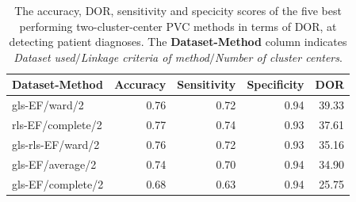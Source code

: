 \begin{table}
    \centering
    \begin{tabular}{lrrrr}
        \toprule
        Dataset-Method    &  Accuracy &  Sensitivity &  Specificity &   DOR \\
        \midrule
        gls-EF/ward/2     &      0.76 &         0.72 &         0.94 & 39.33 \\
        rls-EF/complete/2 &      0.77 &         0.74 &         0.93 & 37.61 \\
        gls-rls-EF/ward/2 &      0.76 &         0.72 &         0.93 & 35.16 \\
        gls-EF/average/2  &      0.74 &         0.70 &         0.94 & 34.90 \\
        gls-EF/complete/2 &      0.68 &         0.63 &         0.94 & 25.75 \\
        \bottomrule
    \end{tabular}
    \caption{The accuracy, DOR, sensitivity and specicity scores of the five best performing two-cluster-center PVC methods in terms of DOR, at detecting patient diagnoses.
             The \textbf{Dataset-Method} column indicates \textit{Dataset used}$/$\textit{Linkage criteria of method}$/$\textit{Number of cluster centers}.}
    \label{tab:pvc_ind_dor_sens_spec_dist}
\end{table}

